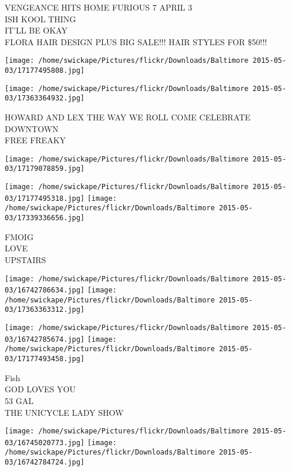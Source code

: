 \documentclass[10pt,letterpaper]{article}
\begin{document}
VENGEANCE HITS HOME FURIOUS 7 APRIL 3\\
ISH KOOL THING\\
IT'LL BE OKAY\\
FLORA HAIR DESIGN PLUS BIG SALE!!!  HAIR STYLES FOR \$50!!!\\
\pagebreak

\texttt{[image: /home/swickape/Pictures/flickr/Downloads/Baltimore 2015-05-03/17177495808.jpg]}

\vspace{0.25in}
\texttt{[image: /home/swickape/Pictures/flickr/Downloads/Baltimore 2015-05-03/17363364932.jpg]}

HOWARD AND LEX THE WAY WE ROLL COME CELEBRATE DOWNTOWN\\
FREE FREAKY\\
\pagebreak

\texttt{[image: /home/swickape/Pictures/flickr/Downloads/Baltimore 2015-05-03/17179078859.jpg]}

\vspace{0.25in}
\texttt{[image: /home/swickape/Pictures/flickr/Downloads/Baltimore 2015-05-03/17177495318.jpg]}
\texttt{[image: /home/swickape/Pictures/flickr/Downloads/Baltimore 2015-05-03/17339336656.jpg]}

FMOIG\\
LOVE\\
UPSTAIRS\\
\pagebreak

\texttt{[image: /home/swickape/Pictures/flickr/Downloads/Baltimore 2015-05-03/16742786634.jpg]}
\texttt{[image: /home/swickape/Pictures/flickr/Downloads/Baltimore 2015-05-03/17363363312.jpg]}

\texttt{[image: /home/swickape/Pictures/flickr/Downloads/Baltimore 2015-05-03/16742785674.jpg]}
\texttt{[image: /home/swickape/Pictures/flickr/Downloads/Baltimore 2015-05-03/17177493458.jpg]}

Fish\\
GOD LOVES YOU\\
53 GAL\\
THE UNICYCLE LADY SHOW\\
\pagebreak

\texttt{[image: /home/swickape/Pictures/flickr/Downloads/Baltimore 2015-05-03/16745020773.jpg]}
\texttt{[image: /home/swickape/Pictures/flickr/Downloads/Baltimore 2015-05-03/16742784724.jpg]}
\end{document}
